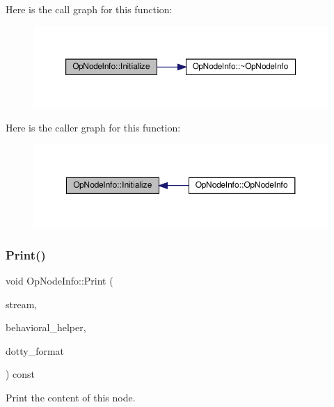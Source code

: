 Here is the call graph for this function\+:
\nopagebreak
\begin{figure}[H]
\begin{center}
\leavevmode
\includegraphics[width=350pt]{da/d53/structOpNodeInfo_a0ce82bb59facad4a65403621b9fe88c6_cgraph}
\end{center}
\end{figure}
Here is the caller graph for this function\+:
\nopagebreak
\begin{figure}[H]
\begin{center}
\leavevmode
\includegraphics[width=350pt]{da/d53/structOpNodeInfo_a0ce82bb59facad4a65403621b9fe88c6_icgraph}
\end{center}
\end{figure}
\mbox{\label{structOpNodeInfo_a8b9d0224e6ca9d88447fe8d7a7c093d8}} 
\subsubsection{\texorpdfstring{Print()}{Print()}}
{\footnotesize\ttfamily void Op\+Node\+Info\+::\+Print (\begin{DoxyParamCaption}\item[{std\+::ostream \&}]{stream,  }\item[{const \hyperlink{behavioral__helper_8hpp_aae973b54cac87eef3b27442aa3e1e425}{Behavioral\+Helper\+Const\+Ref}}]{behavioral\+\_\+helper,  }\item[{const bool}]{dotty\+\_\+format }\end{DoxyParamCaption}) const}



Print the content of this node. 


